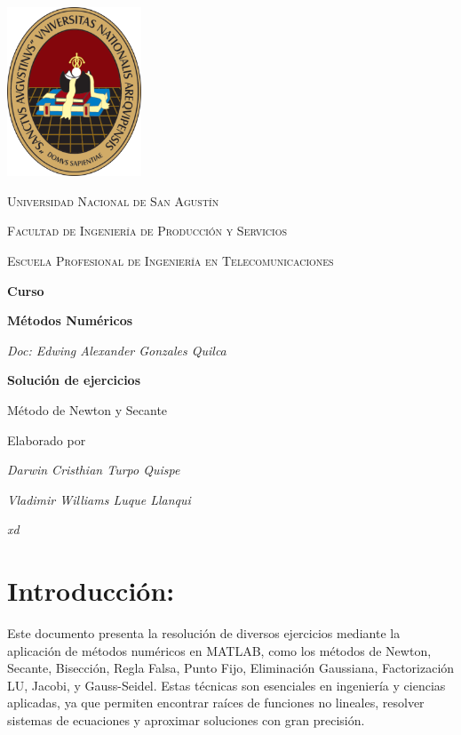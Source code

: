 \documentclass[12pt,a4paper,twoside]{article}  %
\begin{document}
\begin{titlepage}
  \centering
  \includegraphics[width=0.3\textwidth]{unsa-logo.png}\par\vspace{1cm}
  {\scshape\LARGE Universidad Nacional de San Agustín \par}
  {\scshape\Large Facultad de Ingeniería de Producción y Servicios\par}
  {\scshape\large Escuela Profesional de Ingeniería en Telecomunicaciones \par}
  \vspace{0.5cm}
  {\Large\bfseries Curso \par}
  {\Large\bfseries Métodos Numéricos  \par}
  \vspace{0.5cm}
  {\Large\itshape Doc: Edwing Alexander Gonzales Quilca \par}
  \vspace{0.5cm}
  {\Large\bfseries Solución de ejercicios \par}
  \vspace{0.5cm}
  {\Large Método de Newton y Secante\par}

  \vspace{2cm}

  Elaborado por\par
  {\Large\itshape Darwin Cristhian Turpo Quispe \par}
  {\Large\itshape Vladimir Williams Luque Llanqui \par}
  {\Large\itshape xd \par}
  
\end{titlepage}

\newpage


\section{Introducción:}

Este documento presenta la resolución de diversos ejercicios mediante la aplicación de métodos numéricos en MATLAB, como los métodos de Newton, Secante, Bisección, Regla Falsa, Punto Fijo, Eliminación Gaussiana, Factorización LU, Jacobi, y Gauss-Seidel. Estas técnicas son esenciales en ingeniería y ciencias aplicadas, ya que permiten encontrar raíces de funciones no lineales, resolver sistemas de ecuaciones y aproximar soluciones con gran precisión.
\end{document}
